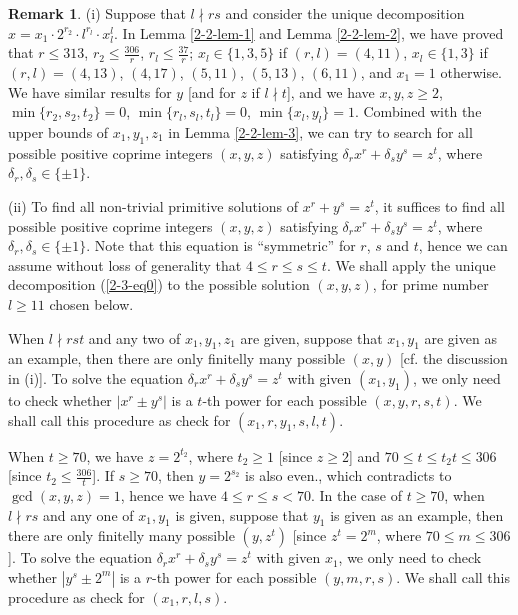 \documentclass[a4paper, 12pt]{article}
\numberwithin{equation}{section}
\theoremstyle{definition}
\newtheorem{remark}[thm]{Remark}
\begin{document}
\begin{remark} \label{2-2-rmk-1}
(i) Suppose that $l\nmid rs$ and consider the unique decomposition $x = x_1 \cdot 2^{r_2} \cdot l^{r_l} \cdot x_l^{l}$. 
In Lemma \ref{2-2-lem-1} and Lemma \ref{2-2-lem-2}, we have proved that $r\le 313$, $r_2 \le \frac{306}{r}$, $r_l \le \frac{37}{r}$;  
$x_l \in \{1,3,5\}$ if $(r,l) = (4,11)$,
$x_l \in \{1,3\}$ if $(r,l) = (4,13)$, $(4,17)$, $(5,11)$, $(5,13)$, $(6,11)$,
and $x_1 = 1$ otherwise. 
We have similar results for $y$ [and for $z$ if $l\nmid t$], and we have $x,y,z\ge 2$, $\min\{r_2,s_2,t_2\} = 0$, $\min\{r_l,s_l,t_l\} = 0$, $\min\{x_l,y_l\} = 1$. 
Combined with the upper bounds of $x_1, y_1, z_1$ in Lemma \ref{2-2-lem-3}, we can try to search for all possible positive coprime integers $(x,y,z)$ satisfying  $\delta_r x^r + \delta_s y^s =  z^t$, where $\delta_r,\delta_s \in \{\pm 1\}$.

(ii) To find all non-trivial primitive solutions of $x^r + y^s = z^t$, it suffices to find all possible positive coprime integers $(x,y,z)$ satisfying  $\delta_r x^r + \delta_s y^s =  z^t$, where $\delta_r,\delta_s \in \{\pm 1\}$. 
Note that this equation is ``symmetric'' for $r$, $s$ and $t$, hence we can assume without loss of generality that $4\le r\le s\le t$.
We shall apply the unique decomposition  (\ref{2-3-eq0}) to the possible solution $(x,y,z)$, for prime number $l \ge 11$ chosen below.

When $l\nmid rst$ and any two of $x_1, y_1, z_1$ are given, suppose that $x_1,y_1$ are given as an example, then there are only finitelly many possible $(x,y)$ [cf. the discussion in (i)]. To solve the equation $\delta_r x^r + \delta_s y^s =  z^t$ with given $(x_1, y_1)$, we only need to check whether $|x^r \pm y^s|$ is a $t$-th power for each possible $(x,y,r,s,t)$. We shall call this procedure as check for $(x_1,r, y_1,s,l,t)$.

When $t \ge 70$, we have $z = 2^{t_2}$, where $t_2 \ge 1$ [since $z\ge 2$] and $70\le t \le t_2 t \le 306$  [since $t_2\le \frac{306}{t}$]. If $s\ge 70$, then $y = 2^{s_2}$ is also even., which contradicts to $\gcd(x,y,z)=1$, hence we have $4\le r \le s < 70$.
In the case of $t\ge 70$, when $l\nmid rs$ and  any one of $x_1, y_1$ is given, suppose that $y_1$ is given as an example, then there are only finitelly many possible $(y, z^t)$ [since $z^t = 2^m$, where $70 \le m \le 306$]. To solve the equation $\delta_r x^r + \delta_s y^s =  z^t$ with given $x_1$, we only need to check whether $|y^s \pm 2^m|$ is a $r$-th power for each possible $(y,m,r,s)$. We shall call this procedure as check for $(x_1,r,l,s)$.


\end{remark}
\end{document}
